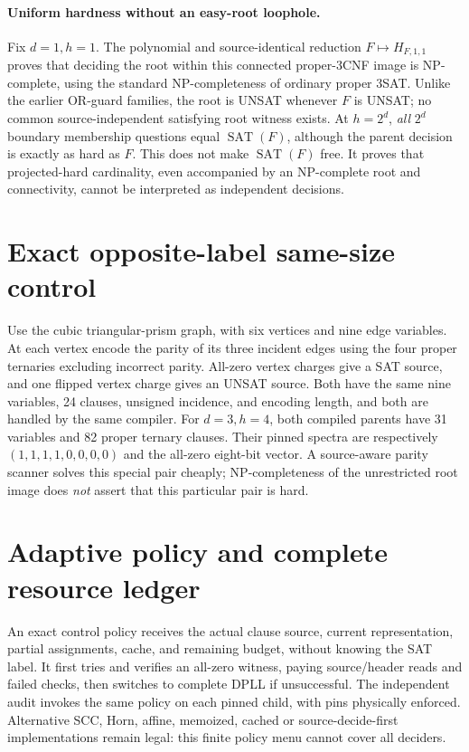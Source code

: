\documentclass[11pt]{article}
\newcommand{\SAT}{\operatorname{SAT}}
\begin{document}
\paragraph{Uniform hardness without an easy-root loophole.}
Fix $d=1,h=1$. The polynomial and source-identical reduction
$F\mapsto H_{F,1,1}$ proves that deciding the root within this
connected proper-3CNF image is NP-complete, using the standard
NP-completeness of ordinary proper 3SAT. Unlike the earlier OR-guard
families, the root is UNSAT whenever $F$ is UNSAT; no common
source-independent satisfying root witness exists.
At $h=2^d$, \emph{all} $2^d$ boundary membership questions equal
$\SAT(F)$, although the parent decision is exactly as hard as $F$.
This does not make $\SAT(F)$ free. It proves that projected-hard
cardinality, even accompanied by an NP-complete root and connectivity,
cannot be interpreted as independent decisions.

\section{Exact opposite-label same-size control}
Use the cubic triangular-prism graph, with six vertices and nine edge
variables. At each vertex encode the parity of its three incident
edges using the four proper ternaries excluding incorrect parity.
All-zero vertex charges give a SAT source, and one flipped vertex
charge gives an UNSAT source. Both have the same nine variables,
24 clauses, unsigned incidence, and encoding length, and both are
handled by the same compiler. For $d=3,h=4$, both compiled parents
have 31 variables and 82 proper ternary clauses. Their pinned
spectra are respectively $(1,1,1,1,0,0,0,0)$ and the all-zero
eight-bit vector. A source-aware parity scanner solves this special
pair cheaply; NP-completeness of the unrestricted root image does
\emph{not} assert that this particular pair is hard.

\section{Adaptive policy and complete resource ledger}
An exact control policy receives the actual clause source, current
representation, partial assignments, cache, and remaining budget,
without knowing the SAT label. It first tries and verifies an
all-zero witness, paying source/header reads and failed checks,
then switches to complete DPLL if unsuccessful. The independent
audit invokes the same policy on each pinned child, with pins
physically enforced. Alternative SCC, Horn, affine, memoized, cached
or source-decide-first implementations remain legal: this finite
policy menu cannot cover all deciders.
\end{document}
